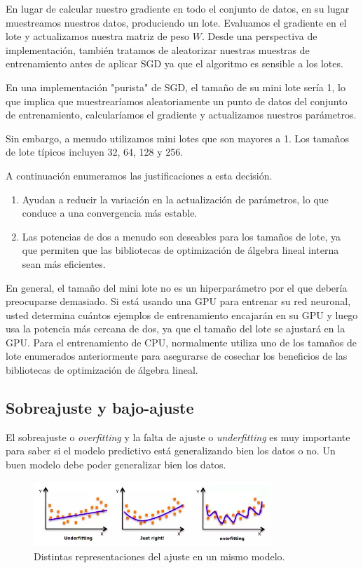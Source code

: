 \documentclass[a4paper,12pt]{article}
\begin{document}
En lugar de calcular nuestro gradiente en todo el conjunto de datos, en su lugar muestreamos nuestros datos, produciendo un lote. Evaluamos el gradiente en el lote y actualizamos nuestra matriz de peso $W$. Desde una perspectiva de implementación, también tratamos de aleatorizar nuestras muestras de entrenamiento antes de aplicar SGD ya que el algoritmo es sensible a los lotes.

En una implementación "purista" de SGD, el tamaño de su mini lote sería 1, lo que implica que muestrearíamos aleatoriamente un punto de datos del conjunto de entrenamiento, calcularíamos el gradiente
y actualizamos nuestros parámetros.

Sin embargo, a menudo utilizamos mini lotes que son mayores a 1. Los tamaños de lote típicos incluyen 32, 64, 128 y 256.

A continuación enumeramos las justificaciones a esta decisión.

\begin{enumerate}[noitemsep, topsep=2pt]
	\item Ayudan a reducir la variación en la actualización de parámetros, lo que conduce a una convergencia más estable. 
	\item Las potencias de dos a menudo son deseables para los tamaños de lote, ya que permiten que las bibliotecas de optimización de álgebra lineal interna sean más eficientes.
\end{enumerate}
En general, el tamaño del mini lote no es un hiperparámetro por el que debería preocuparse demasiado. Si está usando una GPU para entrenar su red neuronal, usted determina cuántos ejemplos de entrenamiento encajarán en su GPU y luego usa la potencia más cercana de dos, ya que el tamaño del lote se ajustará en la GPU. Para el entrenamiento de CPU, normalmente utiliza uno de los tamaños de lote enumerados anteriormente para asegurarse de cosechar los beneficios de las bibliotecas de optimización de álgebra lineal.

\subsection{Sobreajuste y bajo-ajuste}
El sobreajuste o \textit{overfitting} y la falta de ajuste o \textit{underfitting} \cite{quora} es muy importante para saber si el modelo predictivo está generalizando bien los datos o no. Un buen modelo debe poder generalizar bien los datos.

\begin{figure}[H]
	\begin{center}				
	\includegraphics[width=0.8\textwidth]{026.png}
  	\caption{Distintas representaciones del ajuste en un mismo modelo.}
  	\label{fig:fitting}
  	\end{center}
\end{figure}
\end{document}
